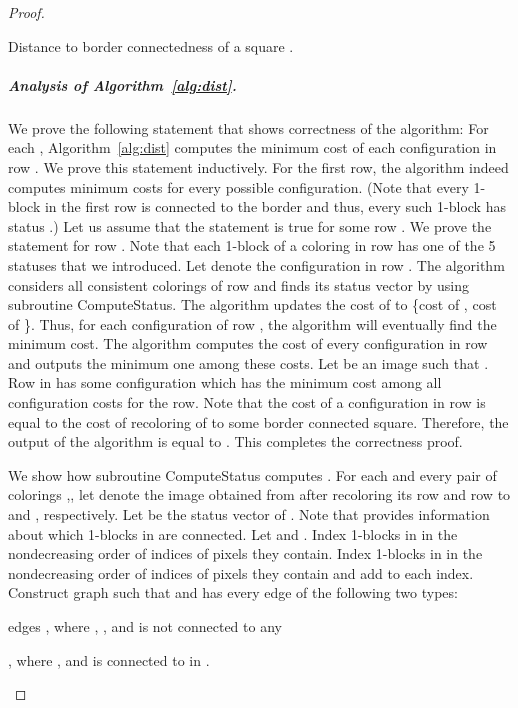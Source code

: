 \documentclass[11pt,english]{article}
\renewenvironment{enumerate}[1]{\begin{compactenum}#1}{\end{compactenum}}
\numberwithin{figure}{section}
\newcommand{\Compst}{{\sf ComputeStatus}\xspace}
\begin{document}
\begin{proof}
\begin{algorithm}
\caption{Distance to border connectedness of a square .}
\label{alg:dist}
\DontPrintSemicolon
\BlankLine
\nl\label{st:init} 

\nl \label{st:subsequent} 


\nl \label{st:actual-min}\Return 


\end{algorithm}

\subparagraph{Analysis of Algorithm~\ref{alg:dist}.}
We prove the following statement that shows correctness of the algorithm: For each , Algorithm~\ref{alg:dist} computes the minimum cost of each configuration in row . We prove this statement inductively. For the first row, the algorithm indeed computes minimum costs for every possible configuration. (Note that every 1-block in the first row is connected to the border and thus, every such 1-block has status .) Let us assume that the statement is true for some row . We prove the statement for row . Note that each 1-block of a coloring in row  has one of the 5 statuses that we introduced. Let  denote the configuration in row . The algorithm considers all consistent colorings  of row  and finds its status vector  by using subroutine \Compst. The algorithm updates the cost of  to \{cost of , cost of \}. Thus, for each configuration of row , the algorithm will eventually find the minimum cost. The algorithm computes the cost of every configuration in row  and outputs the minimum one among these costs. Let  be an image such that . Row  in  has some configuration which has the minimum cost among all configuration costs for the row. Note that the cost of a configuration in row  is equal to the cost of recoloring of  to some border connected square. Therefore, the output of the algorithm is equal to . This completes the correctness proof.

We show how subroutine \Compst computes . For each  and every pair of colorings ,, let  denote the image obtained from  after recoloring its row  and row  to  and , respectively. Let  be the status vector of . Note that  provides information about which 1-blocks in  are connected. Let  and . Index 1-blocks in  in the nondecreasing order of indices of pixels they contain. Index 1-blocks in  in the nondecreasing order of indices of pixels they contain and add  to each index. Construct graph  such that  and  has every edge of the following two types:
\begin{enumerate}
\item edges , where , , and  is not connected to any 
\item , where , and  is connected to  in .
\end{enumerate}


\end{proof}
\end{document}
